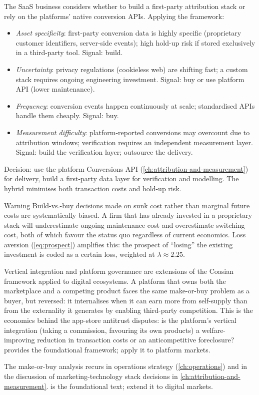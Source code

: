 \begin{example}
The SaaS business considers whether to build a first-party attribution stack or rely on the
platforms' native conversion APIs. Applying the framework:
\begin{itemize}
  \item \emph{Asset specificity}: first-party conversion data is highly specific (proprietary customer
    identifiers, server-side events); high hold-up risk if stored exclusively in a third-party tool.
    Signal: build.
  \item \emph{Uncertainty}: privacy regulations (cookieless web) are shifting fast; a custom stack
    requires ongoing engineering investment. Signal: buy or use platform API (lower maintenance).
  \item \emph{Frequency}: conversion events happen continuously at scale; standardised APIs handle
    them cheaply. Signal: buy.
  \item \emph{Measurement difficulty}: platform-reported conversions may overcount due to attribution
    windows; verification requires an independent measurement layer. Signal: build the verification
    layer; outsource the delivery.
\end{itemize}
Decision: use the platform Conversions API (\cref{ch:attribution-and-measurement}) for delivery,
build a first-party data layer for verification and modelling. The hybrid minimises both transaction
costs and hold-up risk.
\end{example}

\begin{admonition}{Warning}
Build-vs.-buy decisions made on sunk cost rather than marginal future costs are systematically
biased. A firm that has already invested in a proprietary stack will underestimate ongoing
maintenance cost and overestimate switching cost, both of which favour the status quo regardless
of current economics. Loss aversion (\cref{eq:prospect}) amplifies this: the prospect of
``losing'' the existing investment is coded as a certain loss, weighted at \(\lambda\approx2.25\).
\end{admonition}

Vertical integration and platform governance are extensions of the Coasian framework applied to
digital ecosystems. A platform that owns both the marketplace and a competing product faces the
same make-or-buy problem as a buyer, but reversed: it internalises when it can earn more from
self-supply than from the externality it generates by enabling third-party competition. This is
the economics behind the app-store antitrust disputes: is the platform's vertical integration
(taking a commission, favouring its own products) a welfare-improving reduction in transaction
costs or an anticompetitive foreclosure? \textcite{coase1937nature} provides the foundational
framework; \textcite{dranove7theconomics} apply it to platform markets.

The make-or-buy analysis recurs in operations strategy (\cref{ch:operations}) and in the
discussion of marketing-technology stack decisions in \cref{ch:attribution-and-measurement}.
\textcite{coase1937nature} is the foundational text; \textcite{dranove7theconomics} extend it to
digital markets.
